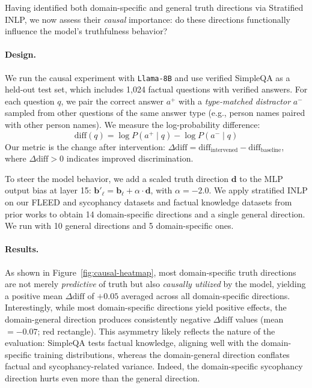 \documentclass{article}
\theoremstyle{plain}
\theoremstyle{definition}
\theoremstyle{remark}
\begin{document}
Having identified both domain-specific and general truth directions via Stratified INLP, we now assess their \emph{causal} importance: do these directions functionally influence the model's truthfulness behavior?

\paragraph{Design.} We run the causal experiment with \texttt{Llama-8B} and use verified  SimpleQA \cite{haas2025simpleqa} as a held-out test set, which includes 1,024 factual questions with verified answers. For each question $q$, we pair the correct answer $a^+$ with a \emph{type-matched distractor} $a^-$ sampled from other questions of the same answer type (e.g., person names paired with other person names). We measure the log-probability difference:
\begin{equation}
    \text{diff}(q) = \log P(a^+ \mid q) - \log P(a^- \mid q)
\end{equation}
Our metric is the change after intervention: $\Delta\text{diff} = \text{diff}_{\text{intervened}} - \text{diff}_{\text{baseline}}$, where $\Delta\text{diff} > 0$ indicates improved discrimination.

To steer the model behavior, we add a scaled truth direction $\mathbf{d}$ to the MLP output bias at layer 15:
$\mathbf{b}'_\ell = \mathbf{b}_\ell + \alpha \cdot \mathbf{d}$,
with $\alpha = -2.0$. We apply stratified INLP on our FLEED and sycophancy datasets and factual knowledge datasets from prior works \cite{azaria2023internal, marksgeometry, goldowsky2025detecting} to obtain 14 domain-specific directions and a single general direction. We run with 10 general directions and 5 domain-specific ones.

\paragraph{Results.} As shown in Figure~\ref{fig:causal-heatmap}, most domain-specific truth directions are not merely \emph{predictive} of truth but also \emph{causally utilized} by the model, yielding a positive mean $\Delta\text{diff}$ of $+0.05$ averaged across all domain-specific directions. 
Interestingly, while most domain-specific directions yield positive effects, the domain-general direction produces consistently negative $\Delta\text{diff}$ values (mean $= -0.07$; red rectangle). This asymmetry likely reflects the nature of the evaluation: SimpleQA tests factual knowledge, aligning well with the domain-specific training distributions, whereas the domain-general direction conflates factual and sycophancy-related variance. Indeed, the domain-specific sycophancy direction hurts even more than the general direction. 
\end{document}
